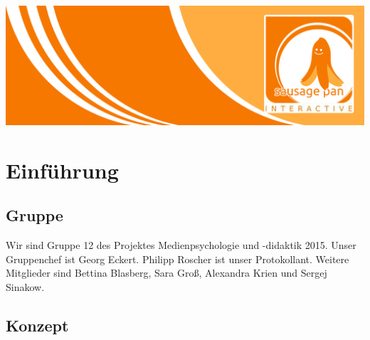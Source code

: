\documentclass[10pt,a4paper,notitlepage]{report}
\author{Sausage Pan}
\begin{document}
	\newcommand{\Eins}[1]{\color{orange}\textbf{{\Large#1}}} %
	\newcommand{\Zwei}[1]{\color{orange}\textbf{{\large#1}}} %
	\newcommand{\Drei}[1]{\color{orange}{\normalsize#1}} %
	\newcommand{\Text}{\color{schwarz}} %
	\newcommand{\Fusszeile}
	{\textit{{\footnotesize Eckert, Georg - Roscher, Philipp - Krien, Alexandra - Sinakow, Sergej - Blasberg, Bettina - Groß, Stephanie Sara}}} %
	\marginpar{\vspace{3.0mm} \color{orange}\rule{0.8mm}{53.3mm} \\[3mm] \color{hellorange}\rule{0.8mm}{170mm}}
	\begin{center}
		\includegraphics[width=160mm]{header2}
	\end{center}
	\tableofcontents
	\clearpage
	\chapter{Einführung}
	\section{Gruppe}
	Wir sind Gruppe 12 des Projektes Medienpsychologie und -didaktik 2015. Unser Gruppenchef ist Georg Eckert. 
	Philipp Roscher ist unser Protokollant. Weitere Mitglieder sind Bettina Blasberg, Sara Groß, Alexandra Krien und Sergej 				Sinakow.

	\section{Konzept}
\end{document}
